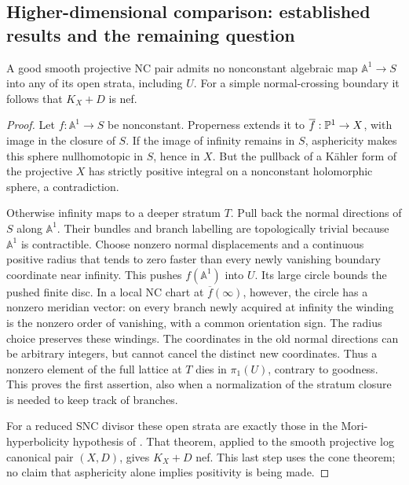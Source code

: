 \subsection{Higher-dimensional comparison: established results and the remaining question}

\begin{proposition}\label{P3c-Mori}
A good smooth projective NC pair admits no nonconstant algebraic
map $\mathbb A^1\to S$ into any of its open strata, including $U$.
For a simple normal-crossing boundary it follows that
$K_X+D$ is nef.
\end{proposition}
\begin{proof}
Let $f:\mathbb A^1\to S$ be nonconstant. Properness extends it to
$\overline f:\mathbb P^1\to X$, with image in the closure of $S$.
If the image of infinity remains in $S$, asphericity makes this
sphere nullhomotopic in $S$, hence in $X$. But the pullback of
a Kähler form of the projective $X$ has strictly positive
integral on a nonconstant holomorphic sphere, a contradiction.

Otherwise infinity maps to a deeper stratum $T$. Pull back the
normal directions of $S$ along $\mathbb A^1$. Their bundles and branch
labelling are topologically trivial because $\mathbb A^1$ is contractible.
Choose nonzero normal displacements and a continuous positive
radius that tends to zero faster than every newly vanishing
boundary coordinate near infinity. This pushes $f(\mathbb A^1)$ into
$U$. Its large circle bounds the pushed finite disc. In a local
NC chart at $\overline f(\infty)$, however, the circle has a
nonzero meridian vector: on every branch newly acquired at
infinity the winding is the nonzero order of vanishing, with
a common orientation sign. The radius choice preserves these
windings. The coordinates in the old normal directions can be
arbitrary integers, but cannot cancel the distinct new
coordinates. Thus a nonzero element of the full lattice at
$T$ dies in $\pi _1(U)$, contrary to goodness. This proves
the first assertion, also when a normalization of the stratum
closure is needed to keep track of branches.

For a reduced SNC divisor these open strata are exactly those
in the Mori-hyperbolicity hypothesis of
\citet[Theorem 1.1]{Svaldi2019}. That theorem, applied to the
smooth projective log canonical pair $(X,D)$, gives
$K_X+D$ nef. This last step uses the cone theorem; no claim
that asphericity alone implies positivity is being made.
\end{proof}

